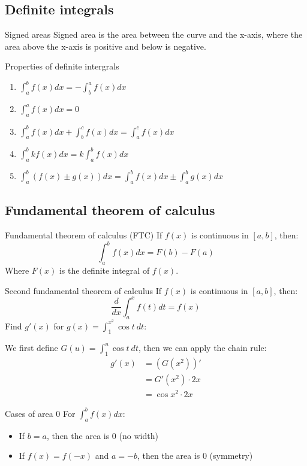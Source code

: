 \documentclass{article}
\begin{document}
\subsection{Definite integrals}
\begin{definition}
    {Signed areas}
    Signed area is the area between the curve and the x-axis, where the area above the x-axis is positive and below is negative.
\end{definition}
\begin{knBox}
    {Properties of definite intergrals}
    \begin{enumerate}
        \item $\int_{a}^{b}f(x)dx=-\int_{b}^{a}f(x)dx$
        \item $\int_{a}^{a}f(x)dx=0$
        \item $\int_{a}^{b}f(x)dx+\int_{b}^{c}f(x)dx=\int_{a}^{c}f(x)dx$
        \item $\int_{a}^{b}kf(x)dx=k\int_{a}^{b}f(x)dx$
        \item $\int_{a}^{b}(f(x)\pm g(x))dx=\int_{a}^{b}f(x)dx\pm\int_{a}^{b}g(x)dx$
    \end{enumerate}
\end{knBox}
\subsection{Fundamental theorem of calculus}
\begin{theorem}
    {Fundamental theorem of calculus (FTC)}
    If $f(x)$ is continuous in $[a,b]$, then:
    \[\int_{a}^{b}f(x)dx=F(b)-F(a)\]
    Where $F(x)$ is the definite integral of $f(x)$.
\end{theorem}
\begin{theorem}
    {Second fundamental theorem of calculus}
    If $f(x)$ is continuous in $[a,b]$, then:
    \[\frac{d}{dx}\int_{a}^{x}f(t)dt=f(x)\]
    \tcblower
    Find $g'(x)$ for $g(x)=\int_1^{x^2}\cos t\ dt$:

    We first define $G(u)=\int_1^{u}\cos t\ dt$, then we can apply the chain rule:
    \begin{align*}
        g'(x) & =(G(x^2))' \\&=G'(x^2)\cdot2x\\&=\cos x^2\cdot2x
    \end{align*}
\end{theorem}
\begin{knBox}
    {Cases of area 0}
    For $\int^{b}_{a}f(x)dx$:
    \begin{itemize}
        \item If $b=a$, then the area is 0 (no width)
        \item If $f(x)=f(-x)$ and $a=-b$, then the area is 0 (symmetry)
    \end{itemize}
\end{knBox}
\end{document}
